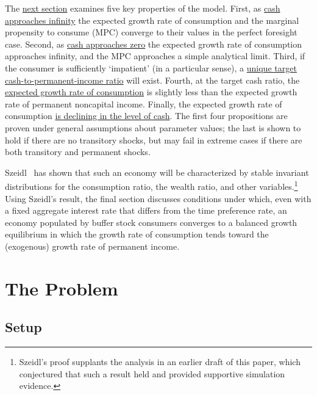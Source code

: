 \documentclass[titlepage]{\econtex}\providecommand{\texname}{BufferStockTheory}%
\begin{document}
The \hyperlink{AnalysisoftheConvergedConsumptionFunction}{next section} examines five key properties of the model. First, as \hyperlink{LimitsAsmtToInfty}{cash approaches infinity} the expected growth rate of consumption and the marginal propensity to consume (MPC) converge to their values in the perfect foresight case. Second, as \hyperlink{LimitsAsmtToZero}{cash approaches zero} the expected growth rate of consumption approaches infinity, and the MPC approaches a simple analytical limit.  Third, if the consumer is sufficiently `impatient' (in a particular sense), a \hyperlink{onetarget}{unique target cash-to-permanent-income ratio} will exist.  Fourth, at the target cash ratio, the \hyperlink{cGroLTpGro}{expected growth rate of consumption} is slightly less than the expected growth rate of permanent noncapital income.  Finally, the expected growth rate of consumption \hyperlink{dcgdxneg}{is declining in the level of cash}. The first four propositions are proven under general assumptions about parameter values; the last is shown to hold if there are no transitory shocks, but may fail in extreme cases if there are both transitory and permanent shocks.

Szeidl~\citeyearpar{szeidlInvariant} has shown that such an economy will be characterized by stable invariant distributions for the consumption ratio, the wealth ratio, and other variables.\footnote{Szeidl's proof supplants the analysis in an earlier draft of this paper, which conjectured that such a result held and provided supportive simulation evidence.}  Using Szeidl's result, the final section discusses conditions under which, even with a fixed aggregate interest rate that differs from the time preference rate, an economy populated by buffer stock consumers converges to a balanced growth equilibrium in which the growth rate of consumption tends toward the (exogenous) growth rate of permanent income.

\hypertarget{The-Problem}{}
\section{The Problem}

\subsection{Setup}
\label{subsec:Setup}
\end{document}
